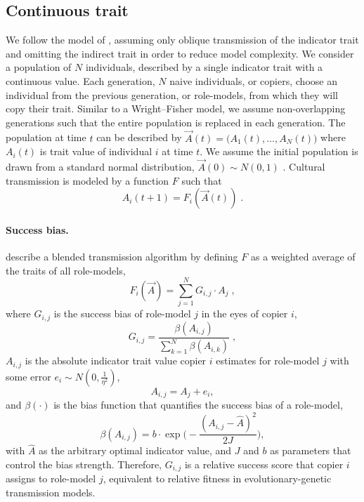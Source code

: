 \documentclass[11pt]{article}
\begin{document}
\subsection{Continuous trait}
We follow the model of \citet{evolutionBook}, assuming only oblique transmission of the indicator trait and omitting the indirect trait in order to reduce model complexity. 
We consider a population of $N$ individuals, described by a single indicator trait with a continuous value.
Each generation, $N$ naive individuals, or copiers, choose an individual from the previous generation, or role-models, from which they will copy their trait. Similar to a Wright–Fisher model, we assume non-overlapping generations such that the entire population is replaced in each generation.
The population at time $t$ can be described by $\vec{A}(t)=\big(A_{1}(t), \ldots, A_{N}(t)\big)$ where $A_{i}(t)$ is trait value of individual $i$ at time $t$. We assume the initial population is drawn from a standard normal distribution, $\vec{A}(0) \sim N(0,1)$ .
Cultural transmission is modeled by a function $F$ such that 
\begin{equation}\label{eq:transmission}
A_{i}(t+1) = F_i(\vec{A}(t)) \;.
\end{equation}

\paragraph{Success bias.}
\citet[Ch.8, p.247-249]{evolutionBook} describe a blended transmission algorithm by defining $F$ as a weighted average of the traits of all role-models, 
\begin{equation}\label{eq:boydF}
F_i(\vec{A}) = \sum_{j=1}^N G_{i,j}\cdot A_{j} \;, 
\end{equation}
where $G_{i,j}$ is the success bias of role-model $j$ in the eyes of copier $i$,
\begin{equation}\label{eq:boydG}
G_{i,j} = \frac{\beta(A_{i,j})}{\sum_{k=1}^{N} \beta(A_{i,k})} \;,
\end{equation}
$A_{i,j}$ is the absolute indicator trait value copier $i$ estimates for role-model $j$ with some error $e_i \sim N(0,\frac{1}{\eta^2})$,
\begin{equation}\label{eq:relativeIndicator}
A_{i,j} = A_j + e_i,
\end{equation}
and $\beta(\cdot)$ is the bias function that quantifies the success bias of a role-model,
\begin{equation}\label{eq:success_bias}
\beta(A_{i,j}) = b \cdot \exp{\Big(-\frac{(A_{i,j} - \hat{A})^2}{2J}\Big)},
\end{equation} 
with $\hat{A}$ as the arbitrary optimal indicator value, and $J$ and $b$ as parameters that control the bias strength.
Therefore, $G_{i,j}$ is a relative success score that copier $i$ assigns to role-model $j$, equivalent to relative fitness in evolutionary-genetic transmission models.
\end{document}
